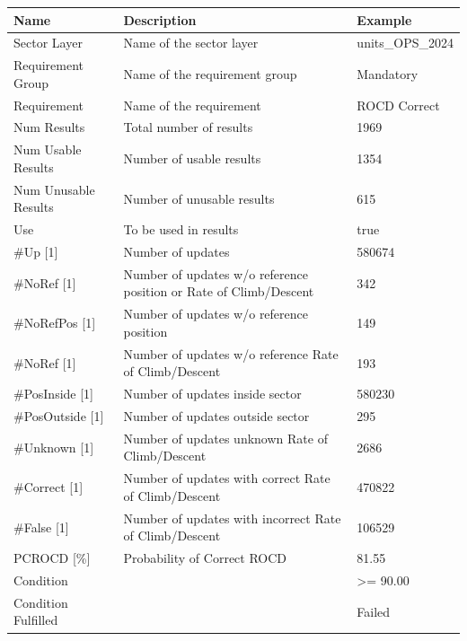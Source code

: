 \begin{center}
 \begin{table}[H]
  \begin{tabularx}{\textwidth}{ | l | X |  l | }
    \hline
    \textbf{Name} & \textbf{Description} & \textbf{Example} \\ \hline
    Sector Layer & Name of the sector layer & units\_OPS\_2024 \\ \hline
    Requirement Group & Name of the requirement group & Mandatory \\ \hline
    Requirement & Name of the requirement & ROCD Correct \\ \hline
    Num Results & Total number of results & 1969 \\ \hline
    Num Usable Results & Number of usable results & 1354 \\ \hline
    Num Unusable Results & Number of unusable results & 615 \\ \hline
    Use & To be used in results & true \\ \hline
    \#Up [1] & Number of updates & 580674 \\ \hline
    \#NoRef [1] & Number of updates w/o reference position or Rate of Climb/Descent & 342 \\ \hline
    \#NoRefPos [1] & Number of updates w/o reference position & 149 \\ \hline
    \#NoRef [1] & Number of updates w/o reference Rate of Climb/Descent & 193 \\ \hline
    \#PosInside [1] & Number of updates inside sector & 580230 \\ \hline
    \#PosOutside [1] & Number of updates outside sector & 295 \\ \hline
    \#Unknown [1] & Number of updates unknown Rate of Climb/Descent & 2686 \\ \hline
    \#Correct [1] & Number of updates with correct Rate of Climb/Descent & 470822 \\ \hline
    \#False [1] & Number of updates with incorrect Rate of Climb/Descent & 106529 \\ \hline
    PCROCD [\%] & Probability of Correct ROCD & 81.55 \\ \hline
    Condition &  & >= 90.00 \\ \hline
    Condition Fulfilled &  & Failed \\ \hline
\end{tabularx}
\end{table}
\end{center}

